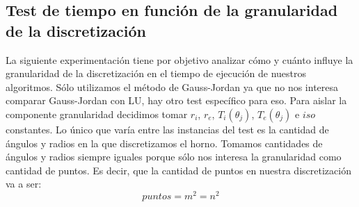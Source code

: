 \subsection{Test de tiempo en función de la granularidad de la discretización}
La siguiente experimentación tiene por objetivo analizar cómo y cuánto influye la granularidad de la discretización en el tiempo de ejecución de nuestros algoritmos. Sólo utilizamos el método de Gauss-Jordan ya que no nos interesa comparar Gauss-Jordan con LU, hay otro test específico para eso.
Para aislar la componente granularidad decidimos tomar $r_i$, $r_e$, $T_i(\theta_j)$, $T_e(\theta_j)$ e $iso$ constantes. Lo único que varía entre las instancias del test es la cantidad de ángulos y radios en la que discretizamos el horno. Tomamos cantidades de ángulos y radios siempre iguales porque sólo nos interesa la granularidad como cantidad de puntos. Es decir, que la cantidad de puntos en nuestra discretización va a ser:
\begin{equation}
 puntos = m^2 = n^2
\end{equation}
